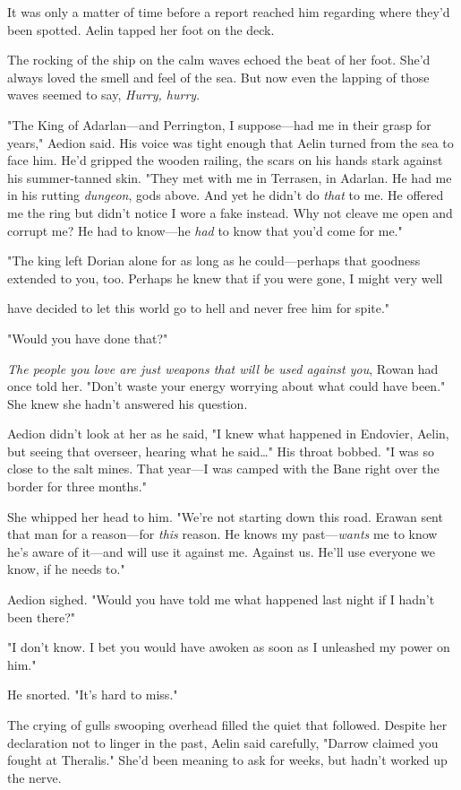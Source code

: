 It was only a matter of time before a report reached him regarding where they'd been spotted. Aelin tapped her foot on the deck.

The rocking of the ship on the calm waves echoed the beat of her foot. She'd always loved the smell and feel of the sea. But now  even the lapping of those waves seemed to say, \emph{Hurry, hurry}.

"The King of Adarlan---and Perrington, I suppose---had me in their grasp for years," Aedion said. His voice was tight enough that Aelin turned from the sea to face him. He'd gripped the wooden railing, the scars on his hands stark against his summer-tanned skin. "They met with me in Terrasen, in Adarlan. He had me in his rutting \emph{dungeon}, gods above. And yet he didn't do \emph{that} to me. He offered me the ring but didn't notice I wore a fake instead. Why not cleave me open and corrupt me? He had to know---he \emph{had} to know that you'd come for me."

"The king left Dorian alone for as long as he could---perhaps that goodness extended to you, too. Perhaps he knew that if you were gone, I might very well

have decided to let this world go to hell and never free him for spite."

"Would you have done that?"

\emph{The people you love are just weapons that will be used against you}, Rowan had once told her. "Don't waste your energy worrying about what could have been." She knew she hadn't answered his question.

Aedion didn't look at her as he said, "I knew what happened in Endovier, Aelin, but seeing that overseer, hearing what he said\ldots" His throat bobbed. "I was so close to the salt mines. That year---I was camped with the Bane right over the border for three months."

She whipped her head to him. "We're not starting down this road. Erawan sent that man for a reason---for \emph{this} reason. He knows my past---\emph{wants} me to know he's aware of it---and will use it against me. Against us. He'll use everyone we know, if he needs to."

Aedion sighed. "Would you have told me what happened last night if I hadn't been there?"

"I don't know. I bet you would have awoken as soon as I unleashed my power on him."

He snorted. "It's hard to miss."

The crying of gulls swooping overhead filled the quiet that followed. Despite her declaration not to linger in the past, Aelin said carefully, "Darrow claimed you fought at Theralis." She'd been meaning to ask for weeks, but hadn't worked up the nerve.

